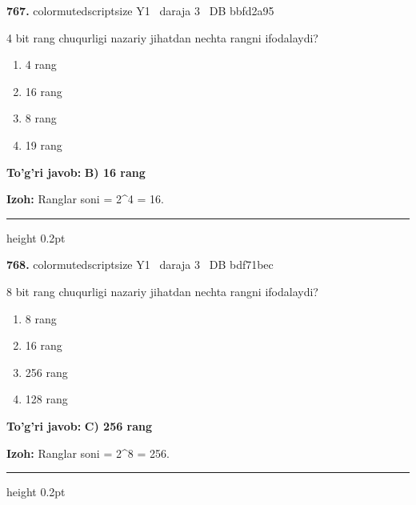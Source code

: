 \documentclass[10pt,a4paper,oneside]{article}
\begin{document}
\noindent\textbf{\color{ink}767.}  {color{muted}scriptsize Y1 \textbullet\ daraja 3 \textbullet\ DB bbfd2a95}
\par
4 bit rang chuqurligi nazariy jihatdan nechta rangni ifodalaydi?
\begin{enumerate}[label=\Alph*),leftmargin=9mm]
\item 4 rang
\item 16 rang
\item 8 rang
\item 19 rang
\end{enumerate}
\begin{tcolorbox}[enhanced,breakable,colback=teal!4,colframe=teal!50!black,boxrule=0.5pt,arc=1.1mm,left=3mm,right=3mm,top=1.7mm,bottom=1.7mm,before skip=2mm,after skip=2mm]
\textbf{\color{teal}To'g'ri javob:} \textbf{B) 16 rang}
\par\smallskip
\textbf{Izoh:} Ranglar soni = 2\textasciicircum{}4 = 16.
\end{tcolorbox}
\vspace{2mm}\hrule height 0.2pt \vspace{3mm}

\noindent\textbf{\color{ink}768.}  {color{muted}scriptsize Y1 \textbullet\ daraja 3 \textbullet\ DB bdf71bec}
\par
8 bit rang chuqurligi nazariy jihatdan nechta rangni ifodalaydi?
\begin{enumerate}[label=\Alph*),leftmargin=9mm]
\item 8 rang
\item 16 rang
\item 256 rang
\item 128 rang
\end{enumerate}
\begin{tcolorbox}[enhanced,breakable,colback=teal!4,colframe=teal!50!black,boxrule=0.5pt,arc=1.1mm,left=3mm,right=3mm,top=1.7mm,bottom=1.7mm,before skip=2mm,after skip=2mm]
\textbf{\color{teal}To'g'ri javob:} \textbf{C) 256 rang}
\par\smallskip
\textbf{Izoh:} Ranglar soni = 2\textasciicircum{}8 = 256.
\end{tcolorbox}
\vspace{2mm}\hrule height 0.2pt \vspace{3mm}
\end{document}
